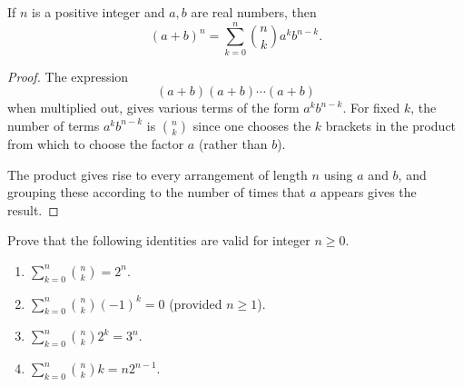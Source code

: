 \documentclass[10pt, a4paper]{article}
\begin{document}
\begin{theorem}
    If $n$ is a positive integer and $a, b$ are real numbers, then
    \[
    (a + b) ^ n = \sum_{k = 0}^{n}\binom{n}{k}a ^ {k} b ^ {n - k}.
    \]
    \begin{proof}
        The expression
        \[
        (a + b)(a + b) \dotsi (a + b)
        \]
        when multiplied out, gives various terms of the form $a ^ k b ^ {n - k}$. For fixed $k$, the number of terms $a ^ {k} b ^ {n - k}$ is $\binom{n}{k}$ since one chooses the $k$ brackets in the product from which to choose the factor $a$ (rather than $b$).

        The product gives rise to every arrangement of length $n$ using $a$ and $b$, and grouping these according to the number of times that $a$ appears gives the result.
    \end{proof}
\end{theorem}

Prove that the following identities are valid for integer $n \geq 0$.
\begin{enumerate}[label = (C\arabic*)]
    \item $\sum_{k = 0}^{n}\binom{n}{k} = 2 ^ n$.
    \item $\sum_{k = 0}^{n}\binom{n}{k}(-1) ^ k = 0$ (provided $n \geq 1$).
    \item $\sum_{k = 0}^{n}\binom{n}{k}2 ^ k = 3 ^ n$.
    \item $\sum_{k = 0}^{n}\binom{n}{k}k = n2 ^ {n - 1}$.
\end{enumerate}
\end{document}
